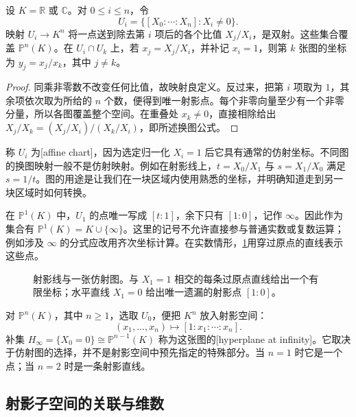 \begin{proposition}\label{g1:prop:projective-charts}
	设 \(K=\mathbb R\) 或 \(\mathbb C\)。对 \(0\leq i\leq n\)，令
	\[
		U_i=\{[X_0:\cdots:X_n]:X_i\ne0\}.
	\]
	映射 \(U_i\rightarrow K^n\) 将一点送到除去第 \(i\) 项后的各个比值 \(X_j/X_i\)，是双射。这些集合覆盖 \(\mathbb P^n(K)\)。在 \(U_i\cap U_k\) 上，若 \(x_j=X_j/X_i\)，并补记 \(x_i=1\)，则第 \(k\) 张图的坐标为 \(y_j=x_j/x_k\)，其中 \(j\ne k\)。
\end{proposition}
\begin{proof}
	同乘非零数不改变任何比值，故映射良定义。反过来，把第 \(i\) 项取为 \(1\)，其余项依次取为所给的 \(n\) 个数，便得到唯一射影点。每个非零向量至少有一个非零分量，所以各图覆盖整个空间。在重叠处 \(x_k\ne0\)，直接相除给出 \(X_j/X_k=(X_j/X_i)/(X_k/X_i)\)，即所述换图公式。
\end{proof}

称 \(U_i\) 为[affine chart]，因为选定归一化 \(X_i=1\) 后它具有通常的仿射坐标。不同图的换图映射一般不是仿射映射。例如在射影线上，\(t=X_0/X_1\) 与 \(s=X_1/X_0\) 满足 \(s=1/t\)。图的用途是让我们在一块区域内使用熟悉的坐标，并明确知道走到另一块区域时如何转换。

\begin{example}\label{g1:exm:projective-line}
	在 \(\mathbb P^1(K)\) 中，\(U_1\) 的点唯一写成 \([t:1]\)，余下只有 \([1:0]\)，记作 \(\infty\)。因此作为集合有 \(\mathbb P^1(K)=K\cup\{\infty\}\)。这里的记号不允许直接参与普通实数或复数运算；例如涉及 \(\infty\) 的分式应改用齐次坐标计算。在实数情形，\cref{g1:fig:projective-line-chart}用穿过原点的直线表示这些点。
\end{example}

\begin{figure}[htbp]
	\centering
	
	\caption[射影线与一张仿射图]{射影线与一张仿射图。与 \(X_1=1\) 相交的每条过原点直线给出一个有限坐标；水平直线 \(X_1=0\) 给出唯一遗漏的射影点 \([1:0]\)。}
	\label{g1:fig:projective-line-chart}
\end{figure}

对 \(\mathbb P^n(K)\)，其中 \(n\geq1\)，选取 \(U_0\)，便把 \(K^n\) 放入射影空间：
\[
	(x_1,\ldots,x_n)\longmapsto[1:x_1:\cdots:x_n].
\]
补集 \(H_\infty=\{X_0=0\}\cong\mathbb P^{n-1}(K)\) 称为这张图的[hyperplane at infinity]。它取决于仿射图的选择，并不是射影空间中预先指定的特殊部分。当 \(n=1\) 时它是一个点；当 \(n=2\) 时是一条射影直线。

\subsection{射影子空间的关联与维数}
\label{g1:subsec:0201:02}

